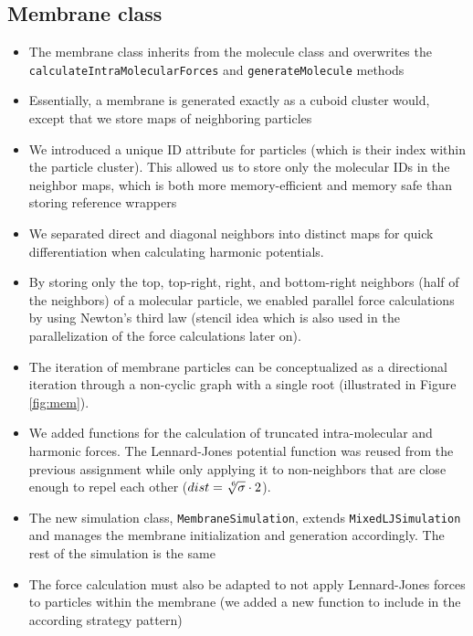 \documentclass{article}
\begin{document}
    \subsection{Membrane class}
    \label{sec:mem:mem}
        \begin{itemize}
            \item The membrane class inherits from the molecule class and overwrites the \texttt{calculateIntraMolecularForces} and \texttt{generateMolecule} methods
            \item Essentially, a membrane is generated exactly as a cuboid cluster would, except that we store maps of neighboring particles 
            \item We introduced a unique ID attribute for particles (which is their index within the particle cluster). This allowed us to store only the molecular IDs in the neighbor maps, which is both more memory-efficient and memory safe than storing reference wrappers
            \item We separated direct and diagonal neighbors into distinct maps for quick differentiation when calculating harmonic potentials.
            \item By storing only the top, top-right, right, and bottom-right neighbors (half of the neighbors) of a molecular particle, we enabled parallel force calculations by using Newton's third law (stencil idea which is also used in the parallelization of the force calculations later on).
            \item The iteration of membrane particles can be conceptualized as a directional iteration through a non-cyclic graph with a single root (illustrated in Figure \ref{fig:mem}).
            \item We added functions for the calculation of truncated intra-molecular and harmonic forces. The Lennard-Jones potential function was reused from the previous assignment while only applying it to non-neighbors that are close enough to repel each other ($dist = \sqrt[\leftroot{-2}\uproot{2}6]{\sigma} \cdot 2$).
            \item The new simulation class, \texttt{MembraneSimulation}, extends \texttt{MixedLJSimulation} and manages the membrane initialization and generation accordingly. The rest of the simulation is the same
            \item The force calculation must also be adapted to not apply Lennard-Jones forces to particles within the membrane (we added a new function to include in the according strategy pattern)
        \end{itemize}
\end{document}
